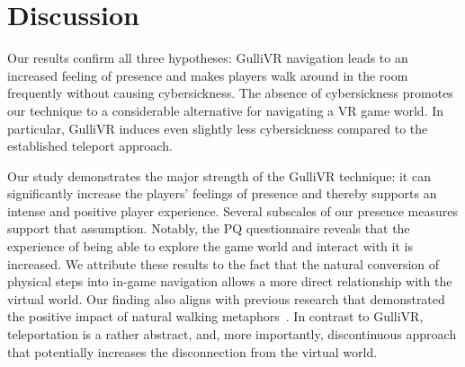 \documentclass{sigchi}
\begin{document}
\section{Discussion}

Our results confirm all three hypotheses: GulliVR navigation leads to an increased feeling of presence and makes players walk around in the room frequently without causing cybersickness. The absence of cybersickness promotes our technique to a considerable alternative for navigating a VR game world. In particular, GulliVR induces even slightly less cybersickness compared to the established teleport approach.



%

Our study demonstrates the major strength of the GulliVR technique: it can significantly increase the players' feelings of presence and thereby supports an intense and positive player experience. Several subscales of our presence measures support that assumption. Notably, the PQ questionnaire reveals that the experience of being able to explore the game world and interact with it is increased. We attribute these results to the fact that the natural conversion of physical steps into in-game navigation allows a more direct relationship with the virtual world. Our finding also aligns with previous research that demonstrated the positive impact of natural walking metaphors~\cite{ruddle2009benefits, slater1995taking, tregillus2016vr, usoh1999walking}. In contrast to GulliVR, teleportation is a rather abstract, and, more importantly, discontinuous approach that potentially increases the disconnection from the virtual world.
\end{document}
